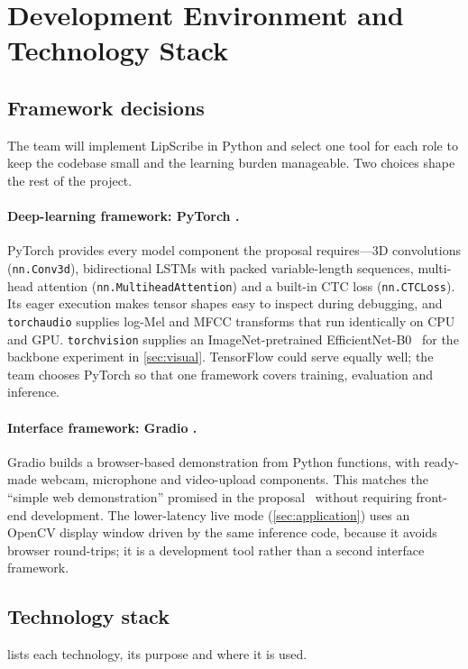 \section{Development Environment and Technology Stack}
\label{sec:stack}

\subsection{Framework decisions}
The team will implement LipScribe in Python and select one tool for each role
to keep the codebase small and the learning burden manageable. Two choices
shape the rest of the project.

\paragraph{Deep-learning framework: PyTorch \rec.}
PyTorch provides every model component the proposal requires---3D
convolutions (\texttt{nn.Conv3d}), bidirectional LSTMs with packed
variable-length sequences, multi-head attention
(\texttt{nn.MultiheadAttention}) and a built-in CTC loss (\texttt{nn.CTCLoss}).
Its eager execution makes tensor shapes easy to inspect during debugging, and
\texttt{torchaudio} supplies log-Mel and MFCC transforms that run identically
on CPU and GPU. \texttt{torchvision} supplies an ImageNet-pretrained
EfficientNet-B0~\cite{tan2019} for the backbone experiment in \cref{sec:visual}.
TensorFlow could serve equally well; the team chooses PyTorch so that one
framework covers training, evaluation and inference.

\paragraph{Interface framework: Gradio \rec.}
Gradio builds a browser-based demonstration from Python functions, with
ready-made webcam, microphone and video-upload components. This matches the
``simple web demonstration'' promised in the proposal \spec\ without requiring
front-end development. The lower-latency live mode (\cref{sec:application})
uses an OpenCV display window driven by the same inference code, because
it avoids browser round-trips; it is a development tool rather than a second
interface framework.

\subsection{Technology stack}
 lists each technology, its purpose and where it is used.

